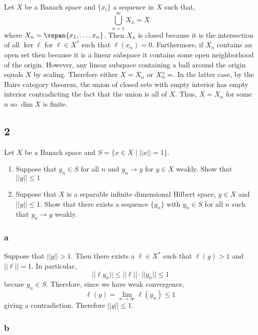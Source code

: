 \documentclass[12pt]{article}
\begin{document}
Let $X$ be a Banach space and $\{ x_i \}$ a sequence in $X$ such that,
\[ \bigcup_{n = 1}^\infty X_n = X \]
where $X_n = \vspan{x_1, \dots, x_n}$. Then $X_n$ is closed because it is the intersection of all $\ker{\ell}$ for $\ell \in X^*$ such that $\ell(x_n) = 0$. Furthermore, if $X_n$ contains an open set then because it is a linear subspace it contains some open neighborhood of the origin. However, any linear subspace containing a ball around the origin equals $X$ by scaling. Therefore either $X = X_n$ or $X_n^\circ = \empty$. In the latter case, by the Baire category theorem, the union of closed sets with empty interior has empty interior contradicting the fact that the union is all of $X$. Thus, $X = X_n$ for some $n$ so $\dim{X}$ is finite.


\subsection{2}

\begin{exercise}
Let $X$ be a Banach space and $S = \{ x \in X \mid || x || = 1 \}$.
\begin{enumerate}
\item Suppose that $y_n \in S$ for all $n$ and $y_n \to y$ for $y \in X$ weakly. Show that $||y || \le 1$
\item Suppose that $X$ is a separable infinite dimensional Hilbert space, $y \in X$ and $||y|| \le 1$. Show that there exists a sequence $\{ y_n \}$ with $y_n \in S$ for all $n$ such that $y_n \to y$ weakly.
\end{enumerate}
\end{exercise}

\subsubsection{a}

Suppose that $|| y || > 1$. Then there exists a $\ell \in X^*$ such that $\ell(y) > 1$ and $|| \ell || = 1$. In particular,
\[ || \ell y_n || \le || \ell || \cdot || y_n || \le 1 \]
becuse $y_n \in S$. Therefore, since we have weak convergence,
\[ \ell(y) = \lim_{n \to \infty} \ell(y_n) \le 1 \]
giving a contradiction. Therefore $|| y || \le 1$.

\subsubsection{b}
\end{document}
